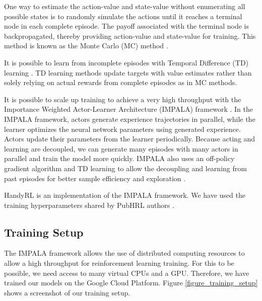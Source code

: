 One way to estimate the action-value and state-value without enumerating all possible states is to randomly simulate the actions until it reaches a terminal node in each complete episode. The payoff associated with the terminal node is backpropagated, thereby providing action-value and state-value for training. This method is known as the Monte Carlo (MC) method \cite{book_rl}.

It is possible to learn from incomplete episodes with Temporal Difference (TD) learning \cite{book_rl}. TD learning methods update targets with value estimates rather than solely relying on actual rewards from complete episodes as in MC methods. 


It is possible to scale up training to achieve a very high throughput with the Importance Weighted Actor-Learner Architecture (IMPALA) framework \cite{paper_impala} \cite{blog_policy_gradient}. In the IMPALA framework, actors generate experience trajectories in parallel, while the learner optimizes the neural network parameters using generated experience. Actors update their parameters from the learner periodically. Because acting and learning are decoupled, we can generate many episodes with many actors in parallel and train the model more quickly. IMPALA also uses an off-policy gradient algorithm \cite{paper_off_policy} and TD learning to allow the decoupling and learning from past episodes for better sample efficiency and exploration \cite{blog_policy_gradient}.

HandyRL \cite{repo_handyrl} is an implementation of the IMPALA framework. We have used the training hyperparameters shared by PubHRL authors \cite{discussion_PubHRL_parameters}.

\subsection{Training Setup}
\label{subsection_training_setup}

The IMPALA framework allows the use of distributed computing resources to allow a high throughput for reinforcement learning training. For this to be possible, we need access to many virtual CPUs and a GPU. Therefore, we have trained our models on the Google Cloud Platform. Figure \ref{figure_training_setup} shows a screenshot of our training setup.


